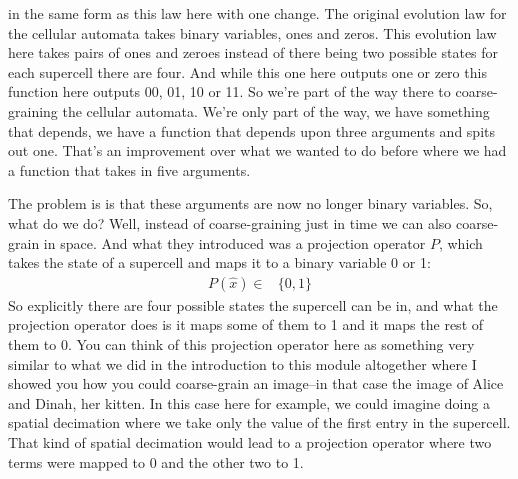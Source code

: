 \documentclass[]{article}
\begin{document}
in the same form as this law here with one change.
The original evolution law for the cellular automata takes binary variables, ones and zeros.
This evolution law here takes pairs of ones and zeroes instead of there being two possible states for each supercell there are four.
And while this one here outputs one or zero
this function here outputs 00, 01, 10 or 11.
So we're part of the way there to coarse-graining the cellular automata.
We're only part of the way, we have something that depends, we have a function that depends upon three arguments and spits out one.
That's an improvement over what we wanted to do before where we had a function that takes in five arguments.

The problem is is that these arguments are now no longer binary variables.
So, what do we do? Well, instead of coarse-graining just in time we can also
coarse-grain in space.
And what they introduced was a projection operator $P$, which takes the state of a supercell and maps it to a binary variable 0 or 1:
\begin{align*}
	P(\hat{x}) \in& \{0,1\}
\end{align*}
So explicitly there are four possible states the supercell can be in, and what the projection operator does is it maps some of them to 1 and it maps the rest of them to 0.
You can think of this projection operator here as something very similar to what we did in the introduction to this module altogether where I showed you how you could coarse-grain an image--in that case the image of Alice and Dinah, her kitten.
In this case here for example, we could imagine doing a spatial decimation where we take only the value of the first entry in the supercell.
That kind of spatial decimation would lead to a projection operator where two terms were mapped to 0 and the other two to 1.
\end{document}
